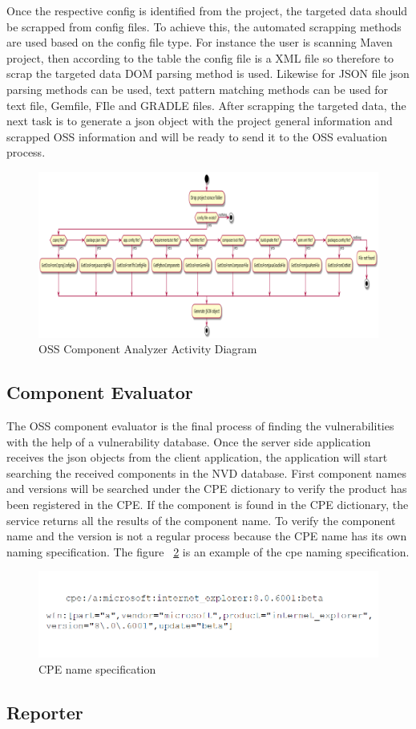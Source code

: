 Once the respective config is identified from the project, the targeted data should be scrapped from config files. To achieve this, the automated scrapping methods are used based on the config file type. For instance the user is scanning Maven project, then according to the table the config file is a XML file so therefore to scrap the targeted data DOM parsing method is used. Likewise for JSON file json parsing methods can be used, text pattern matching methods can be used for text file, Gemfile, FIle and GRADLE files. After scrapping the targeted data, the next task is to generate a json object with the project general information and scrapped OSS information and will be ready to send it to the OSS evaluation process. 
\newpage
 \begin{figure}[h!]
	\includegraphics[width=15cm]{includes/OSS_Analyzer_Activity_Diagram.png}
	\centering
	\caption{\acs{OSS} Component Analyzer Activity Diagram}
	\label{fig:Analyzer_Activity_Diagram}
\end{figure}
\subsection{Component Evaluator}
The OSS component evaluator is the final process of finding the vulnerabilities with the help of a vulnerability database. Once the server side application receives the json objects from the client application, the application will start searching the received components in the NVD database. First component names and versions will be searched under the CPE dictionary to verify the product has been registered in the CPE. If the component is found in the CPE dictionary, the service returns all the results of the component name. To verify the component name and the version is not a regular process because the CPE name has its own naming specification. The figure ~\ref{fig:cpe_name} is an example of the cpe naming specification.
 \begin{figure}[h!]
	\includegraphics[width=15cm]{includes/cpe_name.png}
	\centering
	\caption{CPE name specification}
	\label{fig:cpe_name}
\end{figure}
\subsection{Reporter}
%
